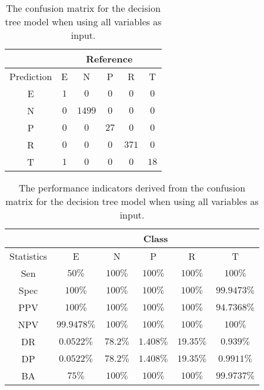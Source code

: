 \begin{table}[!ht]
	\centering
	\begin{tabular}{|c|c|c|c|c|c|}
		\hline
		 & \multicolumn{5}{|c|}{Reference} \\ \hline
		 Prediction & E & N & P & R & T \\ \hline
		 E & $1$ & $0$ & $0$ & $0$ & $0$ \\ \hline
		 N & $0$ & $1499$ & $0$ & $0$ & $0$ \\ \hline
		 P & $0$ & $0$ & $27$ & $0$ & $0$ \\ \hline
		 R & $0$ & $0$ & $0$ & $371$ & $0$ \\ \hline
		 T & $1$ & $0$ & $0$ & $0$ & $18$ \\ \hline
	\end{tabular}
	\caption{The confusion matrix for the decision tree model when using all variables as input.}
	\label{tab:cm:all:C5.0}
\end{table}

\begin{table}[!ht]
	\centering
	\begin{tabular}{|c|c|c|c|c|c|}
		\hline
		 & \multicolumn{5}{c|}{Class} \\ \hline
		Statistics & E & N & P & R & T \\ \hline
		Sen & $50\%$ & $100\%$ & $100\%$ & $100\%$ & $100\%$ \\ \hline
		Spec & $100\%$ & $100\%$ & $100\%$ & $100\%$ & $99.9473\%$ \\ \hline
		PPV & $100\%$ & $100\%$ & $100\%$ & $100\%$ & $94.7368\%$ \\ \hline
		NPV & $99.9478\%$ & $100\%$ & $100\%$ & $100\%$ & $100\%$ \\ \hline
		DR & $0.0522\%$ & $78.2\%$ & $1.408\%$ & $19.35\%$ & $0.939\%$ \\ \hline
		DP & $0.0522\%$ & $78.2\%$ & $1.408\%$ & $19.35\%$ & $0.9911\%$ \\ \hline
		BA & $75\%$ & $100\%$ & $100\%$ & $100\%$ & $99.9737\%$ \\ \hline
	\end{tabular}
	\caption{The performance indicators derived from the confusion matrix for the decision tree model when using all variables as input.}
	\label{tab:cs:reverse:all:C5.0}
\end{table}

